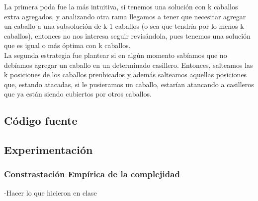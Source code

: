 La primera poda fue la m\'as intuitiva, si tenemos una soluci\'on con k caballos extra agregados,  y analizando otra rama llegamos a tener que necesitar agregar un caballo a una subsoluci\'on de k-1 caballos (o sea que tendr\'ia por lo menos k caballos), entonces no nos interesa seguir revis\'andola, pues tenemos una soluci\'on que es igual o m\'as \'optima con k caballos.\\

La segunda estrategia fue plantear si en alg\'un momento sab\'iamos que no deb\'iamos agregar un caballo en un determinado casillero. Entonces, salteamos las k posiciones de los caballos preubicados y adem\'as salteamos aquellas posiciones que, estando atacadas, si le pusieramos un caballo, estar\'ian atancando a casilleros que ya est\'an siendo cubiertos por otros caballos.\\

\newpage

\subsection{C\'odigo fuente}
\newpage
\subsection{Experimentaci\'on}

\subsubsection*{Constrastaci\'on Emp\'irica de la complejidad}
-Hacer lo que hicieron en clase\\
\newpage
